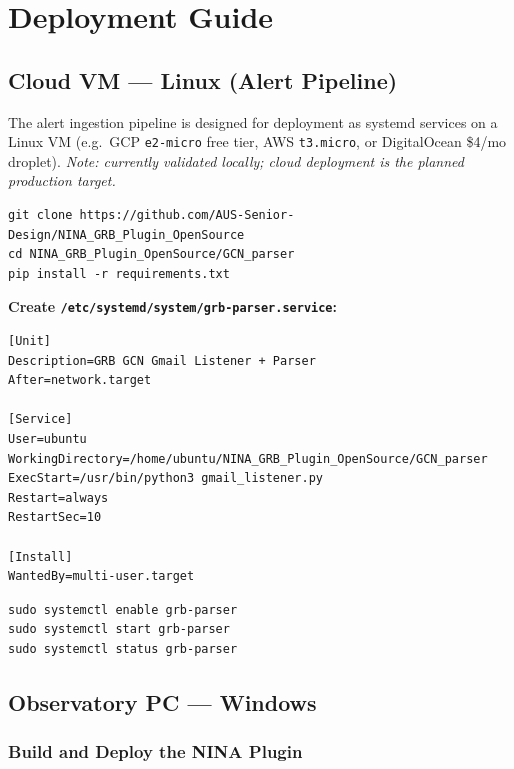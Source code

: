 \documentclass[12pt,a4paper]{article}
\begin{document}
\section{Deployment Guide}

\subsection{Cloud VM --- Linux (Alert Pipeline)}

The alert ingestion pipeline is designed for deployment as systemd services
on a Linux VM (e.g.\ GCP \texttt{e2-micro} free tier, AWS \texttt{t3.micro},
or DigitalOcean \$4/mo droplet). \textit{Note: currently validated locally;
cloud deployment is the planned production target.}

\begin{lstlisting}[style=bash, caption={Install and clone}]
git clone https://github.com/AUS-Senior-Design/NINA_GRB_Plugin_OpenSource
cd NINA_GRB_Plugin_OpenSource/GCN_parser
pip install -r requirements.txt
\end{lstlisting}

\textbf{Create \texttt{/etc/systemd/system/grb-parser.service}:}

\begin{lstlisting}[style=bash]
[Unit]
Description=GRB GCN Gmail Listener + Parser
After=network.target

[Service]
User=ubuntu
WorkingDirectory=/home/ubuntu/NINA_GRB_Plugin_OpenSource/GCN_parser
ExecStart=/usr/bin/python3 gmail_listener.py
Restart=always
RestartSec=10

[Install]
WantedBy=multi-user.target
\end{lstlisting}

\begin{lstlisting}[style=bash, caption={Enable services}]
sudo systemctl enable grb-parser
sudo systemctl start grb-parser
sudo systemctl status grb-parser
\end{lstlisting}

\subsection{Observatory PC --- Windows}

\subsubsection{Build and Deploy the NINA Plugin}
\end{document}
